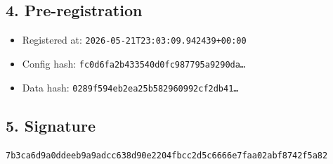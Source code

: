 \documentclass{article}
\begin{document}
\subsection*{4. Pre-registration}
\begin{itemize}
\item Registered at: \texttt{2026-05-21T23:03:09.942439+00:00}
\item Config hash: \texttt{fc0d6fa2b433540d0fc987795a9290da\dots}
\item Data hash: \texttt{0289f594eb2ea25b582960992cf2db41\dots}
\end{itemize}
\subsection*{5. Signature}
\texttt{7b3ca6d9a0ddeeb9a9adcc638d90e2204fbcc2d5c6666e7faa02abf8742f5a82}\\
\end{document}
